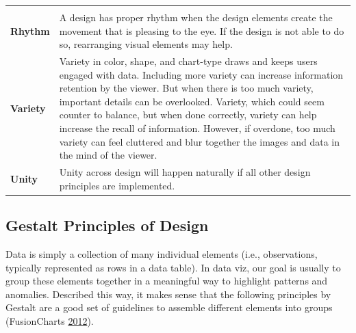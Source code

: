 \documentclass[]{book}
\begin{document}
\begin{longtable}[]{@{}ll@{}}
\begin{minipage}[t]{0.79\columnwidth}
\end{minipage}\tabularnewline
\begin{minipage}[t]{0.15\columnwidth}\raggedright
\textbf{Rhythm}\strut
\end{minipage} & \begin{minipage}[t]{0.79\columnwidth}\raggedright
A design has proper rhythm when the design elements create the movement that is pleasing to the eye. If the design is not able to do so, rearranging visual elements may help.\strut
\end{minipage}\tabularnewline
\begin{minipage}[t]{0.15\columnwidth}\raggedright
\textbf{Variety}\strut
\end{minipage} & \begin{minipage}[t]{0.79\columnwidth}\raggedright
Variety in color, shape, and chart-type draws and keeps users engaged with data. Including more variety can increase information retention by the viewer. But when there is too much variety, important details can be overlooked. Variety, which could seem counter to balance, but when done correctly, variety can help increase the recall of information. However, if overdone, too much variety can feel cluttered and blur together the images and data in the mind of the viewer.\strut
\end{minipage}\tabularnewline
\begin{minipage}[t]{0.15\columnwidth}\raggedright
\textbf{Unity}\strut
\end{minipage} & \begin{minipage}[t]{0.79\columnwidth}\raggedright
Unity across design will happen naturally if all other design principles are implemented.\strut
\end{minipage}\tabularnewline
\bottomrule
\end{longtable}

\hypertarget{gestalt-principles-of-design}{%
\subsection{Gestalt Principles of Design}\label{gestalt-principles-of-design}}

Data is simply a collection of many individual elements (i.e., observations, typically represented as rows in a data table). In data viz, our goal is usually to group these elements together in a meaningful way to highlight patterns and anomalies. Described this way, it makes sense that the following principles by Gestalt are a good set of guidelines to assemble different elements into groups (FusionCharts \protect\hyperlink{ref-principles-fusioncharts}{2012}).
\end{document}
